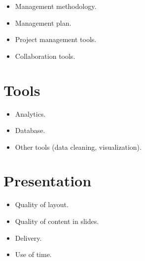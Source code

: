 \documentclass[a4paper,12pt]{report}
\begin{document}
\begin{itemize}
    \item Management methodology.
	\item Management plan.
	\item Project management tools.
	\item Collaboration tools.
\end{itemize}



\chapter{Tools}

\begin{itemize}
    \item Analytics.
	\item Database.
	\item Other tools (data cleaning, visualization).
\end{itemize}



\chapter{Presentation}

\begin{itemize}
    \item Quality of layout.
	\item Quality of content in slides.
	\item Delivery.
	\item Use of time. 
\end{itemize}
\end{document}
